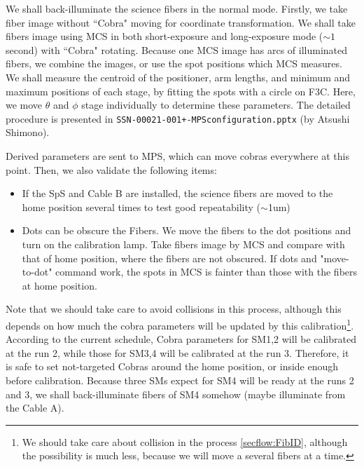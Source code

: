 We shall back-illuminate the science fibers in the normal mode.
Firstly, we take fiber image without ``Cobra" moving for coordinate transformation.
We shall take fibers image using MCS in both short-exposure and long-exposure mode ($\sim 1$ second) with ``Cobra" rotating.
Because one MCS image has arcs of illuminated fibers, we combine the images, or use the spot positions which MCS measures.
We shall measure the centroid of the positioner, arm lengths, and minimum and maximum positions of each stage, by fitting the spots with a circle on F3C.
Here, we move $\theta$ and $\phi$ stage individually to determine these parameters.
The detailed procedure is presented in {\tt SSN-00021-001+-MPSconfiguration.pptx} (by Atsushi Shimono).


Derived parameters are sent to MPS, which can move cobras everywhere at this point.
Then, we also validate the following items:
\begin{itemize}
\item If the SpS and Cable B are installed, the science fibers are moved to the home position several times to test good repeatability ($\sim$1um)
\item Dots can be obscure the Fibers.
We move the fibers to the dot positions and turn on the calibration lamp.
Take fibers image by MCS and compare with that of home position, where the fibers are not obscured.
If dots and "move-to-dot" command work, the spots in MCS is fainter than those with the fibers at home position.
\end{itemize}

Note that we should take care to avoid collisions in this process, although this depends on how much the cobra parameters will be updated by this calibration\footnote{We should take care about collision in the process \ref{secflow:FibID}, although the possibility is much less, because we will move a several fibers at a time.}.
According to the current schedule, Cobra parameters for SM1,2 will be calibrated at the run 2, while those for SM3,4 will be calibrated at the run 3.
Therefore, it is safe to set not-targeted Cobras around the home position, or inside enough before calibration.
Because three SMs expect for SM4 will be ready at the runs 2 and 3, we shall back-illuminate fibers of SM4 somehow (maybe illuminate from the Cable A).


